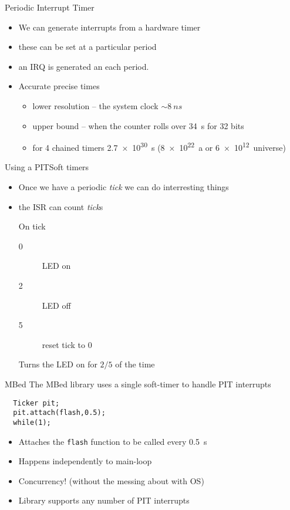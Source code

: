 \documentclass[xcolor=svgnames]{beamer}
\begin{document}
\begin{frame}{Periodic Interrupt Timer}
\begin{itemize}
\item We can generate interrupts from a hardware timer
\item these can be set at a particular period
\item an IRQ is generated an each period.
\item Accurate precise times
\begin{itemize}
\item lower resolution -- the system clock $\sim\SI{8}{ns}$
\item upper bound -- when the counter rolls over \SI{34}{s} for 32 bits
\item for 4 chained timers \SI{2.7e30}{s} (\SI{8e22}{a} or \SI{6e12}{universe})
\end{itemize}
\end{itemize}
\end{frame}

\begin{frame}{Using a PIT}{Soft timers}
\begin{itemize}
\item Once we have a periodic \emph{tick}
we can do interresting things
\item the ISR can count \emph{tick}s
\begin{exampleblock}{On tick}
\begin{description}
\item[0] LED on
\item[2] LED off
\item[5] reset tick to 0
\end{description}
Turns the LED on for  $2/5$ of the time
\end{exampleblock}
\end{itemize}
\end{frame}

\begin{frame}[fragile]{MBed}
The MBed library uses a single soft-timer to handle PIT interrupts
\begin{verbatim}
  Ticker pit;
  pit.attach(flash,0.5);
  while(1);
\end{verbatim}
\begin{itemize}
\item Attaches the \texttt{flash} function to be called every \SI{0.5}{s}
\item Happens independently to main-loop
\item Concurrency!  (without the messing about with OS)
\item Library supports any number of PIT interrupts
\end{itemize}

\end{frame}
\end{document}
